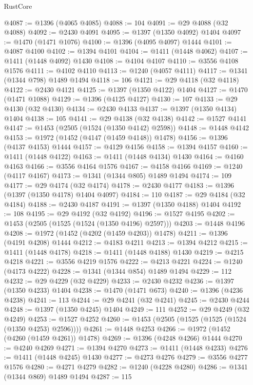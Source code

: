 \begin{lexlean}{RustCore}
\begin{coremodule}
@4087 := @1396 (@4065 @4085)
@4088 := 104
@4091 := @29 @4088 (@32 @4088)
@4092 := @2430 @4091
@4095 := @1397 (@1350 @4092) @1404
@4097 := @1470 (@1471 @1076)
@4100 := @1396 (@4095 @4097) @1444
@4101 := @4087 @4100
@4102 := @1394 @4101
@4104 := @1411 (@1448 @4062)
@4107 := @1411 (@1448 @4092) @1430
@4108 := @4104 @4107
@4110 := @3556 @4108 @1576
@4111 := @4102 @4110
@4113 := @1240 (@4057 @4111)
@4117 := @1341 (@1344 @798) @1489 @1494
@4118 := 106
@4121 := @29 @4118 (@32 @4118)
@4122 := @2430 @4121
@4125 := @1397 (@1350 @4122) @1404
@4127 := @1470 (@1471 @1088)
@4129 := @1396 (@4125 @4127)
@4130 := 107
@4133 := @29 @4130 (@32 @4130)
@4134 := @2430 @4133
@4137 := @1397 (@1350 @4134) @1404
@4138 := 105
@4141 := @29 @4138 (@32 @4138)
@4142 := @1527 @4141
@4147 := @1453 (@2505 (@1524 (@1350 @4142) @2598))
@4148 := @1448 @4142
@4153 := @1972 (@1452 (@4147 (@1459 @4148)) @1478)
@4156 := @1396 (@4137 @4153) @1444
@4157 := @4129 @4156
@4158 := @1394 @4157
@4160 := @1411 (@1448 @4122)
@4163 := @1411 (@1448 @4134) @1430
@4164 := @4160 @4163
@4166 := @3556 @4164 @1576
@4167 := @4158 @4166
@4169 := @1240 (@4117 @4167)
@4173 := @1341 (@1344 @805) @1489 @1494
@4174 := 109
@4177 := @29 @4174 (@32 @4174)
@4178 := @2430 @4177
@4183 := @1396 (@1397 (@1350 @4178) @1404 @4097)
@4184 := 110
@4187 := @29 @4184 (@32 @4184)
@4188 := @2430 @4187
@4191 := @1397 (@1350 @4188) @1404
@4192 := 108
@4195 := @29 @4192 (@32 @4192)
@4196 := @1527 @4195
@4202 := @1453 (@2505 (@1525 (@1524 (@1350 @4196) @2597)))
@4203 := @1448 @4196
@4208 := @1972 (@1452 (@4202 (@1459 @4203)) @1478)
@4211 := @1396 (@4191 @4208) @1444
@4212 := @4183 @4211
@4213 := @1394 @4212
@4215 := @1411 (@1448 @4178)
@4218 := @1411 (@1448 @4188) @1430
@4219 := @4215 @4218
@4221 := @3556 @4219 @1576
@4222 := @4213 @4221
@4224 := @1240 (@4173 @4222)
@4228 := @1341 (@1344 @854) @1489 @1494
@4229 := 112
@4232 := @29 @4229 (@32 @4229)
@4233 := @2430 @4232
@4236 := @1397 (@1350 @4233) @1404
@4238 := @1470 (@1471 @673)
@4240 := @1396 (@4236 @4238)
@4241 := 113
@4244 := @29 @4241 (@32 @4241)
@4245 := @2430 @4244
@4248 := @1397 (@1350 @4245) @1404
@4249 := 111
@4252 := @29 @4249 (@32 @4249)
@4253 := @1527 @4252
@4260 := @1453 (@2505 (@1525 (@1525 (@1524 (@1350 @4253) @2596))))
@4261 := @1448 @4253
@4266 := @1972 (@1452 (@4260 (@1459 @4261)) @1478)
@4269 := @1396 (@4248 @4266) @1444
@4270 := @4240 @4269
@4271 := @1394 @4270
@4273 := @1411 (@1448 @4233)
@4276 := @1411 (@1448 @4245) @1430
@4277 := @4273 @4276
@4279 := @3556 @4277 @1576
@4280 := @4271 @4279
@4282 := @1240 (@4228 @4280)
@4286 := @1341 (@1344 @869) @1489 @1494
@4287 := 115

\end{coremodule}
\end{lexlean}
